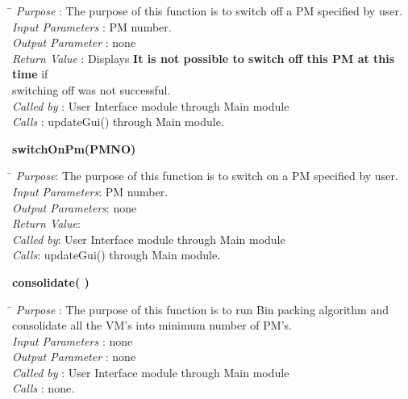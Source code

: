 \documentclass[a4paper,11pt]{article}
\begin{document}
\begin{itemize}
\begin{tabbing}
\hspace*{4cm}\= \kill
 \textit{Purpose} \> : The purpose of this function is to switch off a PM specified by user.\\
  \textit{Input Parameters} \> : PM number. \\
  \textit{Output Parameter} \> : none \\
  \textit{Return Value} \> : Displays \textbf{It is not possible to switch off this PM at this time} if \\ \>switching off was not successful. \\
  \textit{Called by} \> : User Interface module through Main module \\
  \textit{Calls} \> : updateGui() through Main module.\\
\end{tabbing}
\textbf{switchOnPm(PM\textunderscore NO)}
\begin{tabbing}
\hspace*{4cm}\=\kill
\textit{Purpose}\>: The purpose of this function is to switch on a PM specified by user. \\
\textit{Input Parameters}\>: PM number.\\
\textit{Output Parameters}\>: none\\
\textit{Return Value}\>:\\
\textit{Called by}\>: User Interface module through Main module\\
\textit{Calls}\>: updateGui() through Main module.\\
\end{tabbing}

\textbf{consolidate( )}
  
\begin{tabbing}
\hspace*{4cm}\= \kill
 \textit{Purpose} \> : The purpose of this function is to run Bin packing algorithm and \\ \> consolidate all the VM's into minimum number of PM's.\\
  \textit{Input Parameters} \> : none \\
  \textit{Output Parameter} \> : none \\
    \textit{Called by} \> : User Interface module through Main module \\
  \textit{Calls} \> : none.\\
\end{tabbing}
\end{itemize}
\end{document}
